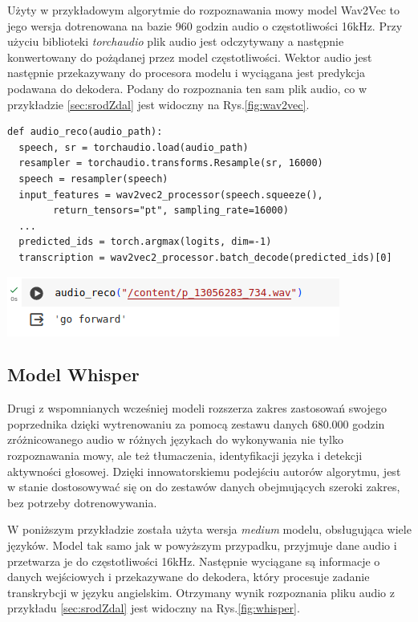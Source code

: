 Użyty w przykładowym algorytmie do rozpoznawania mowy model Wav2Vec to jego wersja dotrenowana na bazie \num{960} godzin audio o częstotliwości \num{16}kHz. Przy użyciu biblioteki \textit{torchaudio} plik audio jest odczytywany a następnie konwertowany do pożądanej przez model częstotliwości. Wektor audio jest następnie przekazywany do procesora modelu i wyciągana jest predykcja podawana do dekodera. Podany do rozpoznania ten sam plik audio, co w przykładzie \ref{sec:srodZdal} jest widoczny na Rys.\ref{fig:wav2vec}.

\begin{lstlisting}
def audio_reco(audio_path):
  speech, sr = torchaudio.load(audio_path)
  resampler = torchaudio.transforms.Resample(sr, 16000)
  speech = resampler(speech)
  input_features = wav2vec2_processor(speech.squeeze(), 
        return_tensors="pt", sampling_rate=16000)
  ...
  predicted_ids = torch.argmax(logits, dim=-1)
  transcription = wav2vec2_processor.batch_decode(predicted_ids)[0]
\end{lstlisting}

\begin{center}
    \includegraphics[width=0.95\linewidth]{files/wav2vectest.png}
    \label{fig:wav2vec}
\end{center}


\subsection{Model Whisper}
\label{subsec:whisper}

Drugi z wspomnianych wcześniej modeli rozszerza zakres zastosowań swojego poprzednika dzięki wytrenowaniu za pomocą zestawu danych \num{680,000} godzin zróżnicowanego audio w różnych językach do wykonywania nie tylko rozpoznawania mowy, ale też tłumaczenia, identyfikacji języka i detekcji aktywności głosowej. Dzięki innowatorskiemu podejściu autorów algorytmu, jest w stanie dostosowywać się on do zestawów danych obejmujących szeroki zakres, bez potrzeby dotrenowywania.

W poniższym przykładzie została użyta wersja \textit{medium} modelu, obsługująca wiele języków. Model tak samo jak w powyższym przypadku, przyjmuje dane audio i przetwarza je do częstotliwości \num{16}kHz. Następnie wyciągane są informacje o danych wejściowych i przekazywane do dekodera, który procesuje zadanie transkrybcji w języku angielskim. Otrzymany wynik rozpoznania pliku audio z przykładu \ref{sec:srodZdal} jest widoczny na Rys.\ref{fig:whisper}.

